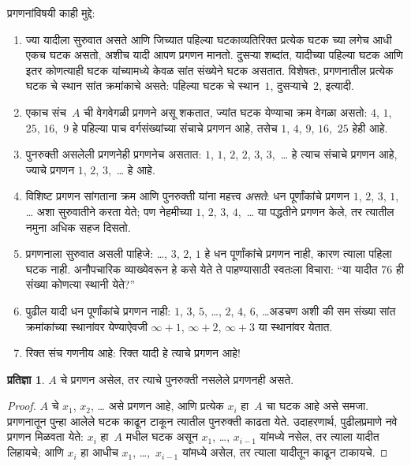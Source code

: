 \documentclass[11pt,a4paper,openany]{book}
\theoremstyle{definition}
\newtheorem{prop}[defn]{प्रतिज्ञा}
\newenvironment{explain}{}{}
\begin{document}
\begin{explain}
प्रगणनांविषयी काही मुद्दे:
\begin{enumerate}
\item ज्या यादीला सुरुवात असते आणि जिच्यात पहिल्या घटकाव्यतिरिक्त
  प्रत्येक घटक च्या लगेच आधी एकच घटक असतो, अशीच यादी
  आपण प्रगणन मानतो. दुसऱ्या शब्दांत, यादीच्या पहिल्या घटक
  आणि इतर कोणत्याही घटक यांच्यामध्ये केवळ सांत संख्येने घटक
  असतात. विशेषतः, प्रगणनातील प्रत्येक घटक चे स्थान सांत
  क्रमांकाचे असते: पहिल्या घटक चे स्थान~$1$, दुसऱ्याचे~$2$, इत्यादी.
\item एकाच संच~$A$ ची वेगवेगळी प्रगणने असू शकतात, ज्यांत
  घटक येण्याचा क्रम वेगळा असतो: $4$, $1$, $25$, $16$,~$9$
  हे पहिल्या पाच वर्गसंख्यांच्या संचाचे प्रगणन आहे, तसेच
  $1$, $4$, $9$, $16$,~$25$ हेही आहे.
\item पुनरुक्ती असलेली प्रगणनेही प्रगणनेच असतात: $1$, $1$, $2$,
  $2$, $3$, $3$,~\dots{} हे त्याच संचाचे प्रगणन आहे, ज्याचे
  प्रगणन $1$, $2$, $3$,~\dots{} हे आहे.
\item विशिष्ट प्रगणन सांगताना क्रम आणि पुनरुक्ती यांना महत्त्व
  \emph{असते}: धन पूर्णांकांचे प्रगणन $1$, $2$, $3$, $1$, \dots{}
  अशा सुरुवातीने करता येते; पण नेहमीच्या $1$, $2$, $3$, $4$,~\dots
  या पद्धतीने प्रगणन केले, तर त्यातील नमुना अधिक सहज दिसतो.
\item प्रगणनाला सुरुवात असली पाहिजे: \dots, $3$, $2$, $1$ हे
  धन पूर्णांकांचे प्रगणन नाही, कारण त्याला पहिला घटक नाही.
  अनौपचारिक व्याख्येवरून हे कसे येते ते पाहण्यासाठी स्वतःला विचारा:
  ``या यादीत 76 ही संख्या कोणत्या स्थानी येते?''
\item पुढील यादी धन पूर्णांकांचे प्रगणन नाही:
  $1$, $3$, $5$, \dots, $2$, $4$, $6$, \dots\@ अडचण अशी की
  सम संख्या सांत क्रमांकांच्या स्थानांवर येण्याऐवजी
  $\infty + 1$, $\infty + 2$, $\infty + 3$ या स्थानांवर येतात.
\item रिक्त संच गणनीय आहे: रिक्त यादी हे त्याचे प्रगणन आहे!{}
\end{enumerate}
\end{explain}

\begin{prop}
  $A$ चे प्रगणन असेल, तर त्याचे पुनरुक्ती नसलेले प्रगणनही असते.
\end{prop}

\begin{proof}
  $A$ चे $x_1$, $x_2$, \dots{} असे प्रगणन आहे, आणि प्रत्येक
  $x_i$ हा~$A$ चा घटक आहे असे समजा. प्रगणनातून पुन्हा
  आलेले घटक काढून टाकून त्यातील पुनरुक्ती काढता येते.
  उदाहरणार्थ, पुढीलप्रमाणे नवे प्रगणन मिळवता येते: $x_i$ हा~$A$
  मधील घटक असून $x_1$, \dots, $x_{i-1}$ यांमध्ये नसेल,
  तर त्याला यादीत लिहायचे; आणि $x_i$ हा आधीच $x_1$, \dots,~$x_{i-1}$
  यांमध्ये असेल, तर त्याला यादीतून काढून टाकायचे.
\end{proof}
\end{document}
